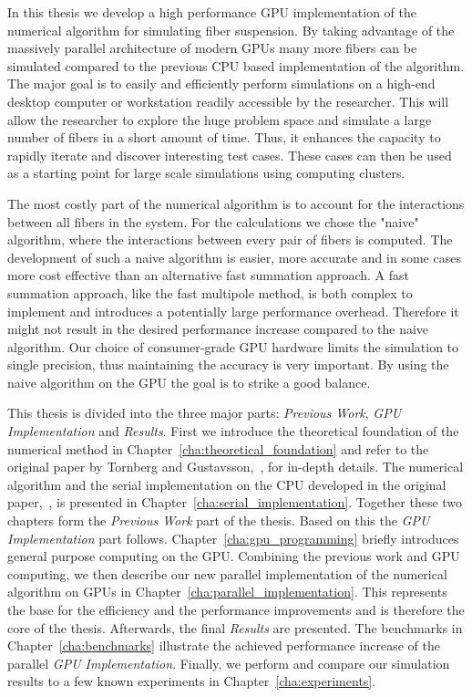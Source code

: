 In this thesis we develop a high performance GPU implementation of the numerical algorithm for simulating fiber suspension. By taking advantage of the massively parallel architecture of modern GPUs many more fibers can be simulated compared to the previous CPU based implementation of the algorithm. The major goal is to easily and efficiently perform simulations on a high-end desktop computer or workstation readily accessible by the researcher. This will allow the researcher to explore the huge problem space and simulate a large number of fibers in a short amount of time. Thus, it enhances the capacity to rapidly iterate and discover interesting test cases. These cases can then be used as a starting point for large scale simulations using computing clusters.

The most costly part of the numerical algorithm is to account for the interactions between all fibers in the system. For the calculations we chose the "naive" algorithm, where the interactions between every pair of fibers is computed. The development of such a naive algorithm is easier, more accurate and in some cases more cost effective than an alternative fast summation approach. A fast summation approach, like the fast multipole method, is both complex to implement and introduces a potentially large performance overhead. Therefore it might not result in the desired performance increase compared to the naive algorithm. Our choice of consumer-grade GPU hardware limits the simulation to single precision, thus maintaining the accuracy is very important. By using the naive algorithm on the GPU the goal is to strike a good balance.

This thesis is divided into the three major parts: \emph{Previous Work}, \emph{GPU Implementation} and \emph{Results}. First we introduce the theoretical foundation of the numerical method in Chapter~\ref{cha:theoretical_foundation} and refer to the original paper by Tornberg and Gustavsson,~\cite{Tornberg2006}, for in-depth details. The numerical algorithm and the serial implementation on the CPU developed in the original paper,~\cite{Tornberg2006}, is presented in Chapter~\ref{cha:serial_implementation}. Together these two chapters form the \emph{Previous Work} part of the thesis. Based on this the \emph{GPU Implementation} part follows. Chapter~\ref{cha:gpu_programming} briefly introduces general purpose computing on the GPU. Combining the previous work and GPU computing, we then describe our new parallel implementation of the numerical algorithm on GPUs in Chapter~\ref{cha:parallel_implementation}. This represents the base for the efficiency and the performance improvements and is therefore the core of the thesis. Afterwards, the final \emph{Results} are presented. The benchmarks in Chapter~\ref{cha:benchmarks} illustrate the achieved performance increase of the parallel \emph{GPU Implementation}. Finally, we perform and compare our simulation results to a few known experiments in Chapter~\ref{cha:experiments}.
